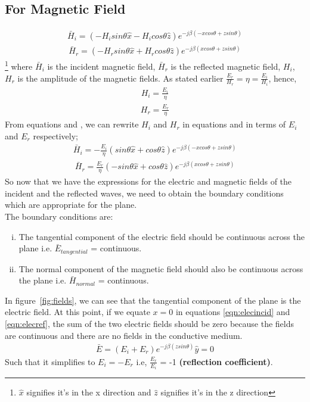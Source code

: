 \subsection{For Magnetic Field}
\begin{align}
\bar{H}_i = (-H_i sin\theta \hat{x} - H_i cos\theta \hat{z}) e ^{-j\beta( -xcos\theta + zsin\theta)}
\label{eqn:magincid}
\end{align}
\begin{align}
\bar{H}_r = (-H_r sin\theta \hat{x} + H_r cos\theta \hat{z}) e ^{-j\beta( xcos\theta + zsin\theta)}
\label{eqn:magref}
\end{align}\footnote{$\hat{x}$ signifies it's in the x direction and $\hat{z}$ signifies it's in the z direction}
where $\bar{H}_i$ is the incident magnetic field, $\bar{H}_r$ is the reflected magnetic field, $H_i$, $H_r$ is the amplitude of the magnetic fields. As stated earlier $\frac{E_r}{H_r} = \eta = \frac{E_i}{H_i}$, hence, 
\begin{align}
H_i = \frac{E_i}{\eta}
\label{eqn:wavemagincid}
\end{align}
\begin{align}
H_r = \frac{E_r}{\eta}
\label{eqn:wavemagref}
\end{align}
From equations  and , we can rewrite $H_i$ and $H_r$ in equations  and  in terms of $E_i$ and $E_r$ respectively;
\begin{align}
\bar{H}_i = - \frac{E_i}{\eta} (sin\theta \hat{x} + cos\theta \hat{z})e^{-j\beta (-xcos\theta + zsin\theta)}
\end{align}
\begin{align}
\bar{H}_r =  \frac{E_r}{\eta} (-sin\theta \hat{x} + cos\theta \hat{z})e^{-j\beta (xcos\theta + zsin\theta)}
\end{align}
So now that we have the expressions for the electric and magnetic fields of the incident and the reflected waves, we need to obtain the boundary conditions which are appropriate for the plane.\\ 
The boundary conditions are:
\begin{enumerate}[(i)]
\item The tangential component of the electric field should be continuous across the plane i.e. $\bar{E}_{tangential}$ = continuous.
\item The normal component of the magnetic field should also be continuous across the plane i.e. $\bar{H}_{normal}$ = continuous.
\end{enumerate} 
In figure~\ref{fig:fields}, we can see that the tangential component of the plane is the electric field. At this point, if we equate $x = 0$ in equations \ref{eqn:elecincid} and \ref{eqn:elecref}, the sum of the two electric fields should be zero because the fields are continuous and there are no fields in the conductive medium.
\begin{align}
\bar{E} = (E_i + E_r) e^{-j\beta(zsin\theta) }\hat{y} = 0
\end{align}
Such that it simplifies to $E_i = - E_r$ i.e, $\frac{E_r}{E_i}$ = -1 \textbf{(reflection coefficient)}. 
 
